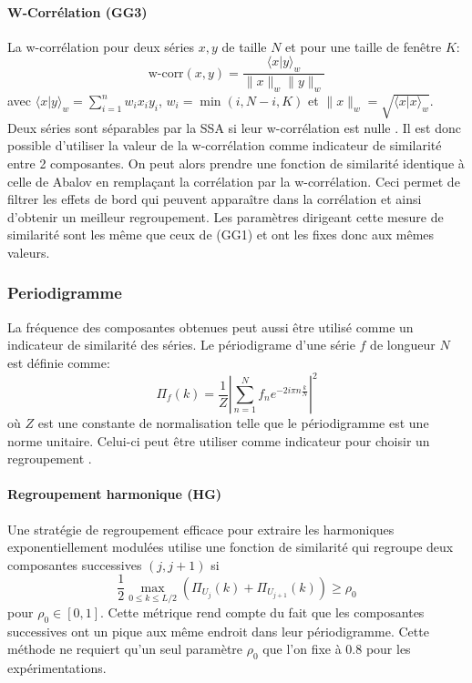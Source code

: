 \documentclass{gretsi}
\begin{document}
\paragraph{W-Corrélation (GG3)}\label{par:GG3} 
    La w-corrélation pour deux séries $x, y$ de taille $N$ et pour une taille de fenêtre $K$:
    $$
    \text{w-corr}(x, y) = \frac{\langle x|y\rangle_w}{\|x\|_w\|y\|_w}
    $$avec $\langle x|y\rangle_w = \sum_{i=1}^n w_i x_i y_i$, $w_i = \min(i, N-i, K)$ et $\|x\|_w = \sqrt{\langle x|x\rangle_w}$. Deux séries sont séparables par la SSA si leur w-corrélation est nulle \cite{GNZ_10_SSA}. Il est donc possible d'utiliser la valeur de la w-corrélation comme indicateur de similarité entre 2 composantes. On peut alors prendre une fonction de similarité identique à celle de Abalov en remplaçant la corrélation par la w-corrélation. Ceci permet de filtrer les effets de bord qui peuvent apparaître dans la corrélation et ainsi d'obtenir un meilleur regroupement. Les paramètres dirigeant cette mesure de similarité sont les même que ceux de (GG1) et ont les fixes donc aux mêmes valeurs.


\subsubsection{Periodigramme}\label{ssub:per}

La fréquence des composantes obtenues peut aussi être utilisé comme un indicateur de similarité des séries. Le périodigrame d'une série $f$ de longueur $N$ est définie comme:
$$
\Pi_f(k) = \frac{1}{Z}\left|\sum_{n=1}^N f_n e^{-2i\pi n \frac{k}{N}}\right|^2
$$où $Z$ est une constante de normalisation telle que le périodigramme est une norme unitaire. Celui-ci peut être utiliser comme indicateur pour choisir un regroupement \cite{GNZ_10_SSA}.

\paragraph{Regroupement harmonique (HG)}\label{par:HG}
    Une stratégie de regroupement efficace pour extraire les harmoniques exponentiellement modulées \cite{alexandrov_05_auto} utilise une fonction de similarité qui regroupe deux composantes successives $(j, j+1)$ si 
    $$
    \frac{1}{2}\max_{0\le k \le L/2}\left(\Pi_{U_j}(k) + \Pi_{U_{j+1}}(k)\right) \ge \rho_0 
    $$pour $\rho_0\in \left[0, 1\right]$. Cette métrique rend compte du fait que les composantes successives ont un pique aux même endroit dans leur périodigramme. Cette méthode ne requiert qu'un seul paramètre $\rho_0$ que l'on fixe à 0.8 pour les expérimentations.
\end{document}
